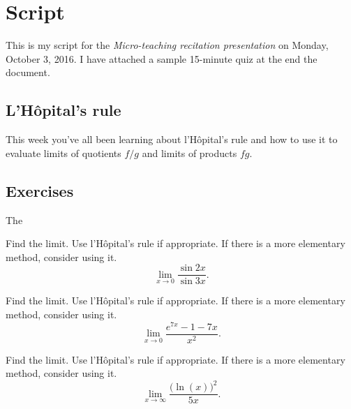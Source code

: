 \documentclass[article,oneside]{memoir}
\begin{document}
%

\author{\textti{\auth}}%
\title{\textti{\tight}}%
\date{\textti{\due}}%

\thispagestyle{empty}
\frontmatter
\maketitle%
\tableofcontents*%
\newpage

\mainmatter
\chapter{Script}
This is my script for the \emph{Micro-teaching recitation presentation} on
Monday, October 3, 2016. I have attached a sample 15-minute quiz at the end
the document.

\section{L'Hôpital's rule}
This week you've all been learning about l'Hôpital's rule and how to use it
to evaluate limits of quotients \(f/g\) and limits of products \(fg\).


\section{Exercises}
The
\begin{problem*}[WebAssign, \# 2]
  Find the limit. Use l'Hôpital's rule if appropriate. If there is a more
  elementary method, consider using it.
  \[
    \lim_{x\to 0}\frac{\sin 2x}{\sin 3x}.
  \]
\end{problem*}
\begin{solution}
\end{solution}

\begin{problem*}[WebAssign, \# 3]
  Find the limit. Use l'Hôpital's rule if appropriate. If there is a more
  elementary method, consider using it.
  \[
    \lim_{x\to 0}\frac{e^{7x}-1-7x}{x^2}.
  \]
\end{problem*}
\begin{solution}
\end{solution}

\begin{problem*}[WebAssign, \# 4]
  Find the limit. Use l'Hôpital's rule if appropriate. If there is a more
  elementary method, consider using it.
  \[
    \lim_{x\to\infty}\frac{\bigl( \ln(x) \bigr)^2}{5x}.
  \]
\end{problem*}
\begin{solution}
\end{solution}
\end{document}
